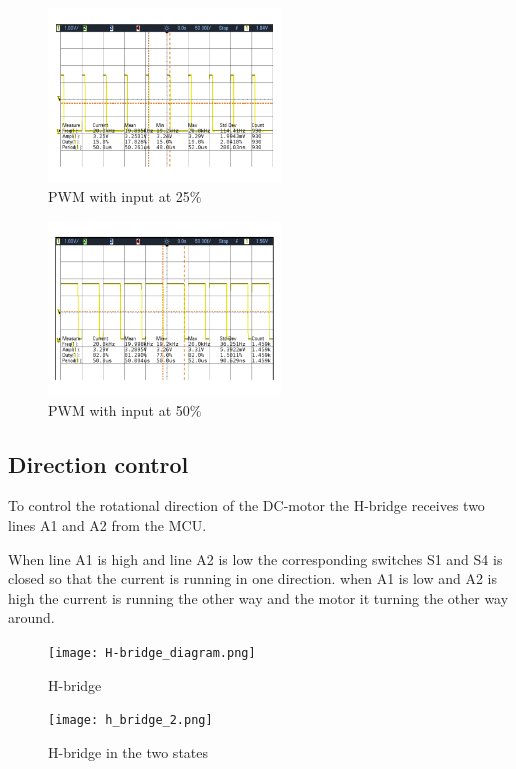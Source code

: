   \begin{figure}[!h]
	\centering
	\includegraphics[width=0.55\textwidth]{resources/Scop/PWM_motot_right_PWMin25.png}
	\caption{PWM with input at 25$\%$}
	\label{fig:1}
\end{figure}

  \begin{figure}[!h]
	\centering
	\includegraphics[width=0.55\textwidth]{resources/Scop/PWM_motot_right_PWMin50.png}
	\caption{PWM with input at 50$\%$}
	\label{fig:2}
\end{figure}

\newpage
\subsection{Direction control} 
To control the rotational direction of the DC-motor the H-bridge receives two lines A1 and A2 from the MCU.

When line A1 is high and line A2 is low the corresponding switches S1 and S4 is closed so that the current is running in one direction. when A1 is low and A2 is high the current is running the other way and the motor it turning the other way around. \\
  \begin{figure}[!h!]
	\centering
	\texttt{[image: H-bridge\_diagram.png]}
	\caption{H-bridge}
	\label{fig:3}
\end{figure}


  \begin{figure}[!h!]
	\centering
	\texttt{[image: h\_bridge\_2.png]}
	\caption{H-bridge in the two states}
	\label{fig:3}
\end{figure}

